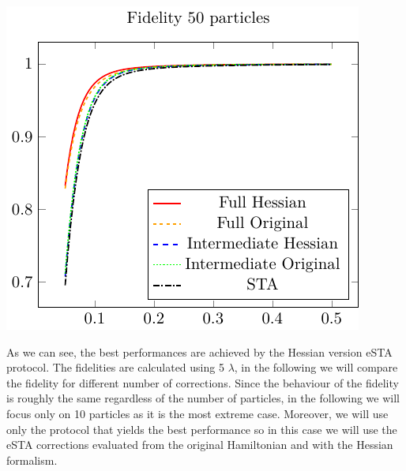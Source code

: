 \begin{center}
    \includegraphics{./gfx/fidelity_np50_nlambda5.pdf}
\end{center}


As we can see, the best performances are achieved by the Hessian version eSTA protocol.
The fidelities are calculated using 5 $ \lambda $, in the following we will compare the fidelity for different number of corrections.
Since the behaviour of the fidelity is roughly the same regardless of the number of particles, in the following we will focus only on 10 particles as it is the most extreme case.
Moreover, we will use only the protocol that yields the best performance so in this case we will use the eSTA corrections evaluated from the original Hamiltonian and with the Hessian formalism.

